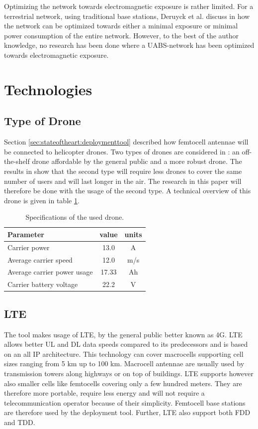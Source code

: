 Optimizing the network towards electromagnetic exposure is rather limited. For a terrestrial network, using traditional base stations,
Deruyck et al. discuss in \cite{J1} how the network can be optimized towards either a minimal exposure or minimal power consumption of the entire network.
However, to the best of the author knowledge, no research has been done where a \gls{UABS}-network has been optimized towards electromagnetic exposure.

\section{Technologies}
\subsection{Type of Drone}

Section \ref{sec:stateoftheart:deploymenttool} described how femtocell antennae will be connected to helicopter drones. Two types of 
drones are considered in \cite{J2}: an off-the-shelf drone affordable by the general public and a more robust drone. The results in \cite{J2}
show that the second type will require less drones to cover the same number of users and will last longer in the air. The research in this paper
will therefore be done with the usage of the second type. A technical overview of this drone is given in table \ref{table:dronespecs}.

\begin{table}[h!]
\centering
\begin{tabular}{|l|c|c|}
\hline
 Parameter          & value      & units   \\    \hline
 Carrier power      & 13.0 &A \\
 Average carrier speed           & 12.0 &m/s       \\ 
 Average carrier power usage    & 17.33& Ah      \\ 
 Carrier battery voltage        & 22.2 &V \\ \hline
\end{tabular}
\caption{Specifications of the used drone.}
\label{table:dronespecs}
\end{table}

\subsection{LTE}
The tool makes usage of \gls{LTE}, by the general public better known as 4G.  \gls{LTE} allows better \gls{UL} and \gls{DL} data speeds 
compared to its predecessors and is based on an all IP architecture. This technology can cover macrocells supporting cell sizes ranging from 5 km up to 100 km. 
Macrocell antennae are usually used by transmission towers along highways or on top of buildings. LTE supports however also smaller cells like
femtocells covering only a few hundred meters. They are therefore more portable, require less energy and will not require a telecommunication operator because
of their simplicity. Femtocell base stations are therefore used by the deployment tool.
Further, \gls{LTE} also support both \gls{FDD} and \gls{TDD}.

